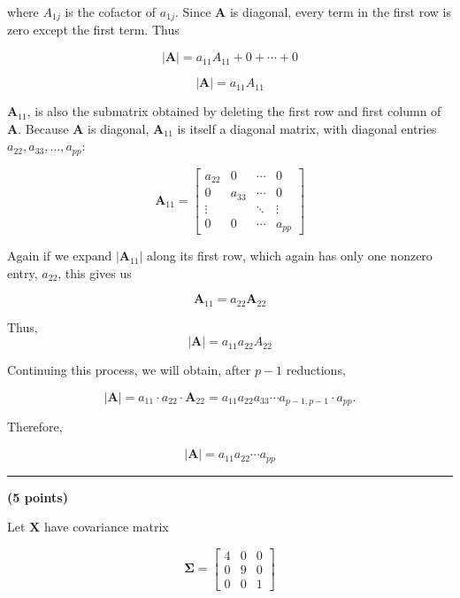 \documentclass[12pt]{article}
\begin{document}
\noindent where $A_{1j}$ is the cofactor of $a_{1j}$. Since $\mathbf{A}$ is diagonal, every term in the first row is zero except the first term. Thus

$$
|\mathbf{A}| = a_{11}A_{11} + 0 + \cdots + 0
$$

$$
|\mathbf{A}| = a_{11}A_{11}
$$

\noindent $\mathbf{A}_{11}$, is also the submatrix obtained by deleting the first row and first column of $\mathbf{A}$. Because $\mathbf{A}$ is diagonal, $\mathbf{A}_{11}$ is itself a diagonal matrix, with diagonal entries $a_{22}, a_{33}, \ldots, a_{pp}$:

$$
\mathbf{A}_{11} =
\begin{bmatrix}
a_{22} & 0 & \cdots & 0 \\
0 & a_{33} & \cdots & 0 \\
\vdots & & \ddots & \vdots \\
0 & 0 & \cdots & a_{pp}
\end{bmatrix}
$$

\noindent Again if we expand $|\mathbf{A}_{11}|$ along its first row, which again has only one nonzero entry, $a_{22}$, this gives us

$$
\mathbf{A}_{11} = a_{22}\mathbf{A}_{22}
$$

Thus, 
$$
|\mathbf{A}| = a_{11}a_{22}A_{22}
$$

\noindent Continuing this process, we will obtain, after $p-1$ reductions,

$$
|\mathbf{A}| = a_{11}\cdot a_{22} \cdot \mathbf{A}_{22} = a_{11}a_{22}a_{33}\cdots a_{p-1,p-1}\cdot a_{pp}.
$$

\noindent Therefore,

$$
\boxed{|\mathbf{A}| = a_{11}a_{22}\cdots a_{pp}}
$$

\vspace{2em}

\noindent\rule{\textwidth}{0.4pt}

\vspace{2em}

 \hfill {\large \textbf{(5 points)}}

\vspace{1em}

\noindent Let $\mathbf{X}$ have covariance matrix

$$
\boldsymbol{\Sigma} = \begin{bmatrix} 4 & 0 & 0 \\ 0 & 9 & 0 \\ 0 & 0 & 1 \end{bmatrix}
$$
\end{document}
